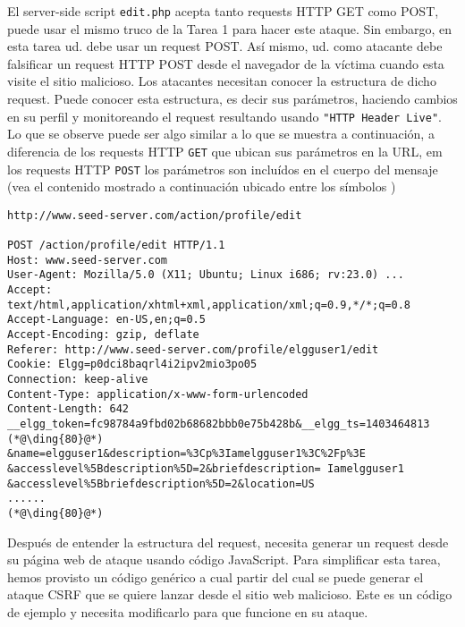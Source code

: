 El server-side script {\tt edit.php} acepta tanto requests HTTP GET como POST, puede usar el mismo truco de la Tarea 1 para hacer este ataque.
Sin embargo, en esta tarea ud. debe usar un request POST.
Así mismo, ud. como atacante debe falsificar un request HTTP POST desde el navegador de la víctima cuando esta visite el sitio malicioso.
Los atacantes necesitan conocer la estructura de dicho request. Puede conocer esta estructura, es decir sus parámetros, haciendo cambios en su perfil y monitoreando el request resultando usando \texttt{"HTTP Header Live"}.
Lo que se observe puede ser algo similar a lo que se muestra a continuación, a diferencia de los requests HTTP {\tt GET} que ubican sus parámetros en la URL, em los requests HTTP {\tt POST} los parámetros son incluídos en el cuerpo del mensaje (vea el contenido mostrado a continuación ubicado entre los símbolos )

\begin{lstlisting}
http://www.seed-server.com/action/profile/edit

POST /action/profile/edit HTTP/1.1
Host: www.seed-server.com
User-Agent: Mozilla/5.0 (X11; Ubuntu; Linux i686; rv:23.0) ...
Accept: text/html,application/xhtml+xml,application/xml;q=0.9,*/*;q=0.8
Accept-Language: en-US,en;q=0.5
Accept-Encoding: gzip, deflate
Referer: http://www.seed-server.com/profile/elgguser1/edit
Cookie: Elgg=p0dci8baqrl4i2ipv2mio3po05
Connection: keep-alive
Content-Type: application/x-www-form-urlencoded
Content-Length: 642
__elgg_token=fc98784a9fbd02b68682bbb0e75b428b&__elgg_ts=1403464813  (*@\ding{80}@*) 
&name=elgguser1&description=%3Cp%3Iamelgguser1%3C%2Fp%3E
&accesslevel%5Bdescription%5D=2&briefdescription= Iamelgguser1
&accesslevel%5Bbriefdescription%5D=2&location=US
......                                                              (*@\ding{80}@*)
\end{lstlisting}

Después de entender la estructura del request, necesita generar un request desde su página web de ataque usando código JavaScript.
Para simplificar esta tarea, hemos provisto un código genérico a cual partir del cual se puede generar el ataque CSRF que se quiere lanzar desde el sitio web malicioso. Este es un código de ejemplo y necesita modificarlo para que funcione en su ataque.


